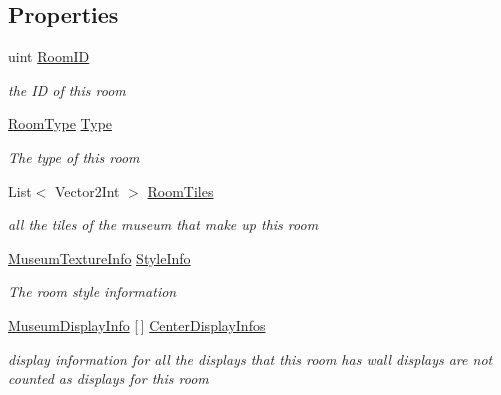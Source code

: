 \subsection*{Properties}
\begin{DoxyCompactItemize}
\item 
uint \mbox{\hyperlink{class_room_a499df97242b8996b66cc22737159f59c}{Room\+ID}}
\begin{DoxyCompactList}\small\item\em the ID of this room \end{DoxyCompactList}\item 
\mbox{\hyperlink{_room_8cs_ab540f7414f306325d92272bcef1e34e1}{Room\+Type}} \mbox{\hyperlink{class_room_a55dc5c580ea31562a0aa6f11b4b8f462}{Type}}
\begin{DoxyCompactList}\small\item\em The type of this room \end{DoxyCompactList}\item 
List$<$ Vector2\+Int $>$ \mbox{\hyperlink{class_room_aed67349f7f161cb2214111eff3e51018}{Room\+Tiles}}
\begin{DoxyCompactList}\small\item\em all the tiles of the museum that make up this room \end{DoxyCompactList}\item 
\mbox{\hyperlink{class_museum_texture_info}{Museum\+Texture\+Info}} \mbox{\hyperlink{class_room_a3cd7f8c4f2ee7b7397a40a463cd14196}{Style\+Info}}
\begin{DoxyCompactList}\small\item\em The room style information \end{DoxyCompactList}\item 
\mbox{\hyperlink{class_museum_display_info}{Museum\+Display\+Info}} \mbox{[}$\,$\mbox{]} \mbox{\hyperlink{class_room_ab7a1da4fa70bf843d643391bdbaa1fb5}{Center\+Display\+Infos}}
\begin{DoxyCompactList}\small\item\em display information for all the displays that this room has wall displays are not counted as displays for this room \end{DoxyCompactList}\end{DoxyCompactItemize}
